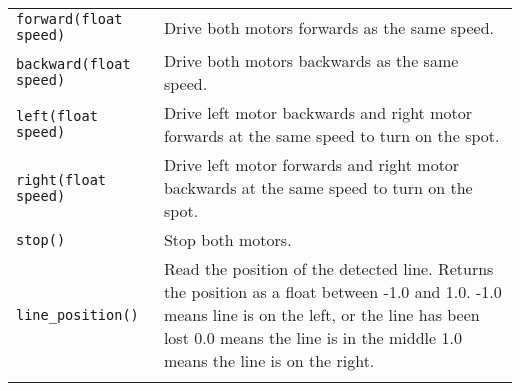 \begin{longtable}[]{@{}ll@{}}
\begin{minipage}[t]{0.30\columnwidth}
\lstinline!forward(float speed)!\strut
\end{minipage} & \begin{minipage}[t]{0.65\columnwidth}\raggedright\strut
Drive both motors forwards as the same speed.\strut
\end{minipage}\tabularnewline
\begin{minipage}[t]{0.30\columnwidth}\raggedright\strut
\lstinline!backward(float speed)!\strut
\end{minipage} & \begin{minipage}[t]{0.65\columnwidth}\raggedright\strut
Drive both motors backwards as the same speed.\strut
\end{minipage}\tabularnewline
\begin{minipage}[t]{0.30\columnwidth}\raggedright\strut
\lstinline!left(float speed)!\strut
\end{minipage} & \begin{minipage}[t]{0.65\columnwidth}\raggedright\strut
Drive left motor backwards and right motor forwards at the same speed to
turn on the spot.\strut
\end{minipage}\tabularnewline
\begin{minipage}[t]{0.30\columnwidth}\raggedright\strut
\lstinline!right(float speed)!\strut
\end{minipage} & \begin{minipage}[t]{0.65\columnwidth}\raggedright\strut
Drive left motor forwards and right motor backwards at the same speed to
turn on the spot.\strut
\end{minipage}\tabularnewline
\begin{minipage}[t]{0.30\columnwidth}\raggedright\strut
\lstinline!stop()!\strut
\end{minipage} & \begin{minipage}[t]{0.65\columnwidth}\raggedright\strut
Stop both motors.\strut
\end{minipage}\tabularnewline
\begin{minipage}[t]{0.30\columnwidth}\raggedright\strut
\lstinline!line_position()!\strut
\end{minipage} & \begin{minipage}[t]{0.65\columnwidth}\raggedright\strut
Read the position of the detected line. Returns the position as a float
between -1.0 and 1.0. -1.0 means line is on the left, or the line has
been lost 0.0 means the line is in the middle 1.0 means the line is on
the right.\strut
\end{minipage}\tabularnewline
\begin{minipage}[t]{0.30\columnwidth}\raggedright\strut

\end{minipage}
\end{longtable}
